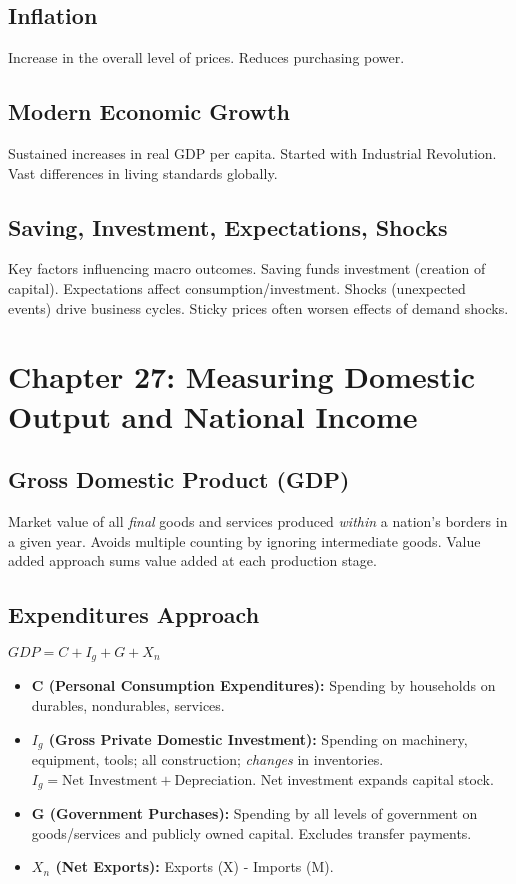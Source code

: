 \documentclass{article}
\begin{document}
\subsection*{Inflation}
Increase in the overall level of prices. Reduces purchasing power.

\subsection*{Modern Economic Growth}
Sustained increases in real GDP per capita. Started with Industrial Revolution. Vast differences in living standards globally.

\subsection*{Saving, Investment, Expectations, Shocks}
Key factors influencing macro outcomes. Saving funds investment (creation of capital). Expectations affect consumption/investment. Shocks (unexpected events) drive business cycles. Sticky prices often worsen effects of demand shocks.

\section*{Chapter 27: Measuring Domestic Output and National Income}

\subsection*{Gross Domestic Product (GDP)}
Market value of all \textit{final} goods and services produced \textit{within} a nation's borders in a given year. Avoids multiple counting by ignoring intermediate goods. Value added approach sums value added at each production stage.

\subsection*{Expenditures Approach}
$GDP = C + I_g + G + X_n$
\begin{itemize}
    \item \textbf{C (Personal Consumption Expenditures):} Spending by households on durables, nondurables, services.
    \item \textbf{$I_g$ (Gross Private Domestic Investment):} Spending on machinery, equipment, tools; all construction; \textit{changes} in inventories. $I_g = \text{Net Investment} + \text{Depreciation}$. Net investment expands capital stock.
    \item \textbf{G (Government Purchases):} Spending by all levels of government on goods/services and publicly owned capital. Excludes transfer payments.
    \item \textbf{$X_n$ (Net Exports):} Exports (X) - Imports (M).
\end{itemize}
\end{document}
